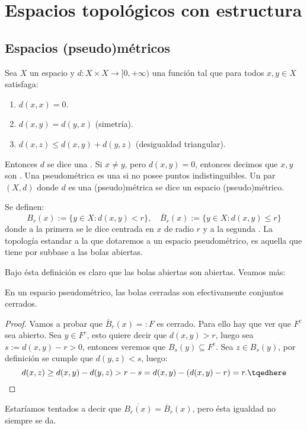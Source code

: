 \documentclass[topologia-analisis.tex]{subfiles}
\begin{document}
\chapter{Espacios topológicos con estructura}

\section{Espacios (pseudo)métricos}
\begin{mydefi}
	Sea $X$ un espacio y $d : X\times X \to [0, +\infty)$ una función tal que para todos $x,y\in X$ satisfaga:
	\begin{enumerate}
		\item $d(x, x) = 0$.
		\item $d(x, y) = d(y, x)$ (simetría).
		\item $d(x, z) \le d(x, y) + d(y, z)$ (desigualdad triangular).
	\end{enumerate}
	Entonces $d$ se dice una .
	Si $x \ne y$, pero $d(x, y) = 0$, entonces decimos que $x,y$ son .
	Una pseudométrica es una  si no posee puntos indistinguibles.
	Un par $(X, d)$ donde $d$ es una (pseudo)métrica se dice un espacio (pseudo)métrico.

	Se definen:
	$$ B_r(x) := \{ y\in X : d(x, y) < r \}, \quad \overline B_r(x) := \{ y\in X : d(x, y) \le r \} $$
	donde a la primera se le dice  centrada en $x$ de radio $r$ y a la segunda .
	La topología estandar a la que dotaremos a un espacio pseudométrico, es aquella que tiene por subbase a las bolas abiertas.
\end{mydefi}

Bajo ésta definición es claro que las bolas abiertas son abiertas.
Veamos más:
\begin{prop}
	En un espacio pseudométrico, las bolas cerradas son efectivamente conjuntos cerrados.
\end{prop}
\begin{proof}
	Vamos a probar que $\overline B_r(x) =: F$ es cerrado.
	Para ello hay que ver que $F^c$ sea abierto.
	Sea $y \in F^c$, esto quiere decir que $d(x, y) > r$, luego sea $s := d(x, y) - r > 0$, entonces veremos que $B_s(y) \subseteq F^c$.
	Sea $z \in B_s(y)$, por definición se cumple que $d(y, z) < s$, luego:
	\begin{equation}
		d(x, z) \ge d(x, y) - d(y, z) > r - s = d(x, y) - ( d(x, y) - r ) = r. \tqedhere
	\end{equation}
\end{proof}
Estaríamos tentados a decir que $ \overline{ B_r(x) } = \overline B_r(x) $, pero ésta igualdad no siempre se da.
\end{document}
